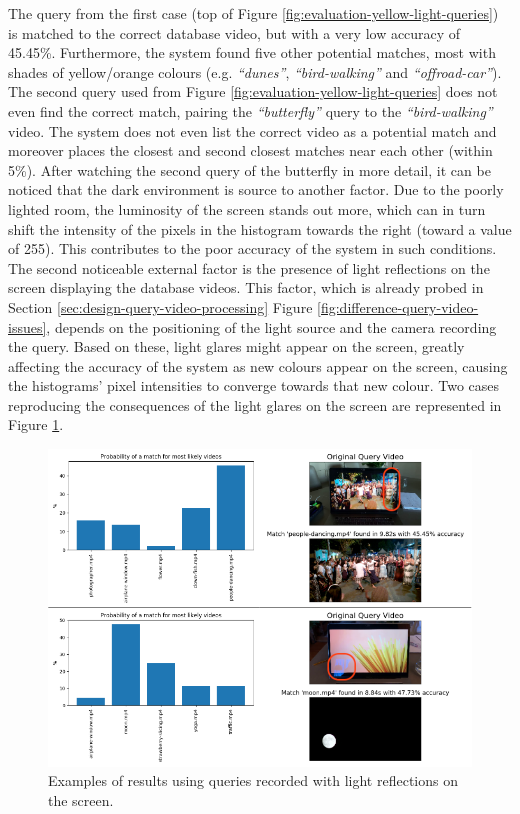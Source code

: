 The query from the first case (top of Figure \ref{fig:evaluation-yellow-light-queries}) is matched to the correct database video, but with a very low accuracy of 45.45\%. Furthermore, the system found five other potential matches, most with shades of yellow/orange colours (e.g. \textit{``dunes''}, \textit{``bird-walking''} and \textit{``offroad-car''}). The second query used from Figure \ref{fig:evaluation-yellow-light-queries} does not even find the correct match, pairing the \textit{``butterfly''} query to the \textit{``bird-walking''} video. The system does not even list the correct video as a potential match and moreover places the closest and second closest matches near each other (within 5\%). After watching the second query of the butterfly in more detail, it can be noticed that the dark environment is source to another factor. Due to the poorly lighted room, the luminosity of the screen stands out more, which can in turn shift the intensity of the pixels in the histogram towards the right (toward a value of 255). This contributes to the poor accuracy of the system in such conditions.\\

The second noticeable external factor is the presence of light reflections on the screen displaying the database videos. This factor, which is already probed in Section \ref{sec:design-query-video-processing} Figure \ref{fig:difference-query-video-issues}, depends on the positioning of the light source and the camera recording the query. Based on these, light glares might appear on the screen, greatly affecting the accuracy of the system as new colours appear on the screen, causing the histograms' pixel intensities to converge towards that new colour. Two cases reproducing the consequences of the light glares on the screen are represented in Figure \ref{fig:evaluation-light-reflection-queries}.\\ %

\begin{figure}[h] 
\centerline{\includegraphics[width=\textwidth]{figures/evaluation/light-reflection-queries.png}}
\caption{\label{fig:evaluation-light-reflection-queries}Examples of results using queries recorded with light reflections on the screen.}
\end{figure}

